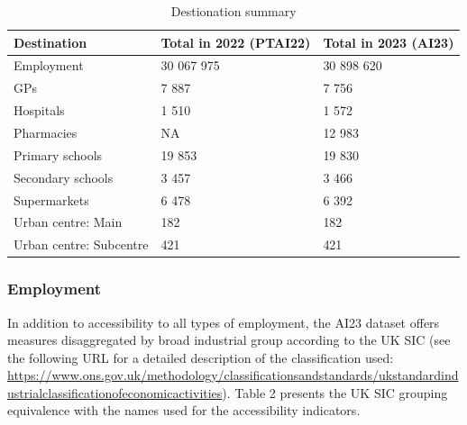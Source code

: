 \documentclass{article}
\begin{document}
\begin{table}[!h]

\caption{\label{tab:unnamed-chunk-2}Destionation summary}
\centering
\begin{tabu} to 
\toprule
Destination & Total in 2022
(PTAI22) & Total in 2023
(AI23)\\
\midrule
Employment & 30 067 975 & 30 898 620\\
GPs & 7 887 & 7 756\\
Hospitals & 1 510 & 1 572\\
Pharmacies & NA & 12 983\\
Primary schools & 19 853 & 19 830\\
\addlinespace
Secondary schools & 3 457 & 3 466\\
Supermarkets & 6 478 & 6 392\\
Urban centre: Main & 182 & 182\\
Urban centre: Subcentre & 421 & 421\\
\bottomrule
\end{tabu}
\end{table}

\hypertarget{employment}{%
\subsubsection{Employment}\label{employment}}

In addition to accessibility to all types of employment, the AI23
dataset offers measures disaggregated by broad industrial group
according to the UK SIC (see the following URL for a detailed
description of the classification used:
\url{https://www.ons.gov.uk/methodology/classificationsandstandards/ukstandardindustrialclassificationofeconomicactivities}).
Table 2 presents the UK SIC grouping equivalence with the names used for
the accessibility indicators.
\end{document}
